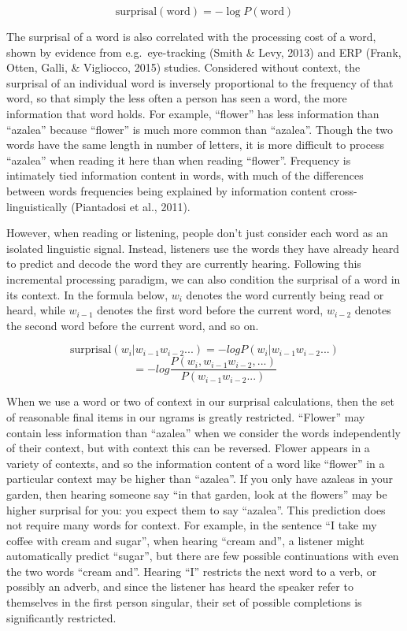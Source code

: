 \documentclass[man,floatsintext]{apa6}
\begin{document}
\[\text{surprisal}(\text{word}) = -\log P(\text{word})\]

The surprisal of a word is also correlated with the processing cost of a word, shown by evidence from e.g.~eye-tracking (Smith \& Levy, 2013) and ERP (Frank, Otten, Galli, \& Vigliocco, 2015) studies. Considered without context, the surprisal of an individual word is inversely proportional to the frequency of that word, so that simply the less often a person has seen a word, the more information that word holds. For example, \enquote{flower} has less information than \enquote{azalea} because \enquote{flower} is much more common than \enquote{azalea}. Though the two words have the same length in number of letters, it is more difficult to process \enquote{azalea} when reading it here than when reading \enquote{flower}. Frequency is intimately tied information content in words, with much of the differences between words frequencies being explained by information content cross-linguistically (Piantadosi et al., 2011).

However, when reading or listening, people don't just consider each word as an isolated linguistic signal. Instead, listeners use the words they have already heard to predict and decode the word they are currently hearing. Following this incremental processing paradigm, we can also condition the surprisal of a word in its context. In the formula below, \(w_i\) denotes the word currently being read or heard, while \(w_{i-1}\) denotes the first word before the current word, \(w_{i-2}\) denotes the second word before the current word, and so on.

\[\text{surprisal}(w_i|w_{i-1}w_{i-2}...) = -log P(w_i|w_{i-1}w_{i-2}...)\]
\[= -log \frac{P(w_i,w_{i-1}w_{i-2},...)}{P(w_{i-1}w_{i-2}...)}\]

When we use a word or two of context in our surprisal calculations, then the set of reasonable final items in our ngrams is greatly restricted. \enquote{Flower} may contain less information than \enquote{azalea} when we consider the words independently of their context, but with context this can be reversed. Flower appears in a variety of contexts, and so the information content of a word like \enquote{flower} in a particular context may be higher than \enquote{azalea}. If you only have azaleas in your garden, then hearing someone say \enquote{in that garden, look at the flowers} may be higher surprisal for you: you expect them to say \enquote{azalea}. This prediction does not require many words for context. For example, in the sentence \enquote{I take my coffee with cream and sugar}, when hearing \enquote{cream and}, a listener might automatically predict \enquote{sugar}, but there are few possible continuations with even the two words \enquote{cream and}. Hearing \enquote{I} restricts the next word to a verb, or possibly an adverb, and since the listener has heard the speaker refer to themselves in the first person singular, their set of possible completions is significantly restricted.
\end{document}
